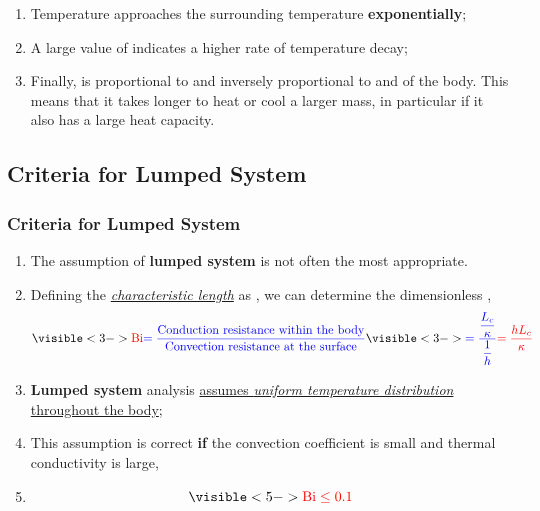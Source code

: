 \documentclass[10pt,compress,unknownkeysallowed]{beamer}
\begin{document}
\begin{frame}
\begin{enumerate}
\begin{enumerate}
           \item<5-> Temperature  approaches the surrounding temperature  {\bf exponentially};
           \item<6-> A large value of  indicates a higher rate of temperature decay;
           \item<7-> Finally,  is proportional to  and inversely proportional to  and  of the body. This means that it takes longer to heat or cool a larger mass, in particular if it also has a large heat capacity.
        \end{enumerate}
   \end{enumerate}
\end{frame}


\subsection{Criteria for Lumped System}


\begin{frame}
 \frametitle{Criteria for Lumped System}
   \begin{enumerate}%
     \item<1-> The assumption of {\bf lumped system} is not often the most appropriate. 
     \item<2-> Defining the \underline{\it characteristic length} as , we can determine the dimensionless ,
       \begin{equation}
          \visible<3->{\red{\Bi} \blue{= \frc{\text{Conduction resistance within the body}}{\text{Convection resistance at the surface}}}} \visible<3->{\blue{= \frc{\frc{L_{c}}{\kappa}}{\frc{1}{h}}} \red{= \frc{h L_{c}}{\kappa}}}
       \end{equation}  
     \item<4-> {\bf Lumped system} analysis \underline{assumes {\it uniform temperature distribution}} \underline{throughout the body};
     \item<4-> This assumption is correct {\bf if} the convection coefficient is small and thermal conductivity is large, \ie
     \item<5->  
                     \begin{displaymath}
                       \visible<5->{ \red{\Bi \leq 0.1}}
                     \end{displaymath}
   \end{enumerate}
\end{frame}
\end{document}
